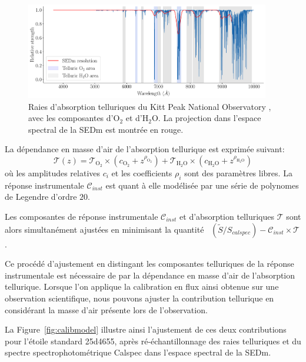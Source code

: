 \documentclass[../main/main.tex]{subfiles}
\begin{document}
\begin{figure}[ht]
  \centering
  \includegraphics[width=0.95\textwidth]{../figures/06_irf/telluricspec.pdf}
  \caption[Raies d'absorption telluriques]{Raies d'absorption
    telluriques du Kitt Peak National Observatory \citep{Hinkle2003}, avec les composantes d'$\text{O}_{2}$ et
    d'$\text{H}_{2}\text{O}$. La projection dans l'espace spectral de la
  SEDm est montrée en rouge.}
  \label{fig:telluriclines}
\end{figure}

La dépendance en masse d'air de l'absorption tellurique est exprimée suivant:
\begin{equation*}
  \label{eq:telluricpysedm2}
  \mathcal{T}(z) =
  \mathcal{T}_{\text{O}_{2}}\times(c_{\text{O}_{2}}+z^{\rho_{\text{O}_{2}}})
  + \mathcal{T}_{\text{H}_{2}\text{O}}\times(c_{\text{H}_{2}\text{O}}+z^{\rho_{\text{H}_{2}\text{O}}})
\end{equation*}
où les amplitudes relatives $c_{i}$ et les coefficients
$\rho_{i}$ sont des paramètres libres. La réponse instrumentale
$\mathcal{C}_{inst}$ est quant à elle modélisée par une série de polynomes de Legendre
d'ordre $20$.

Les composantes de réponse instrumentale $\mathcal{C}_{inst}$ et
d'absorption telluriques $\mathcal{T}$ sont alors simultanément
ajustées en minimisant la quantité ~$(\tilde{S}/S_{calspec}) - \mathcal{C}_{inst}\times\mathcal{T}$.

Ce procédé d'ajustement en distingant les composantes telluriques de la
réponse instrumentale est nécessaire de par la dépendance en masse
d'air de l'absorption tellurique. Lorsque l'on applique la
calibration en flux ainsi obtenue sur une observation scientifique, nous
pouvons ajuster la contribution tellurique en considérant la masse d'air
présente lors de l'observation.

La Figure~\ref{fig:calibmodel} illustre ainsi l'ajustement de ces deux
contributions pour l'étoile standard 25d4655, après ré-échantillonnage
des raies telluriques et du spectre spectrophotométrique Calspec dans
l'espace spectral de la SEDm.
\end{document}
